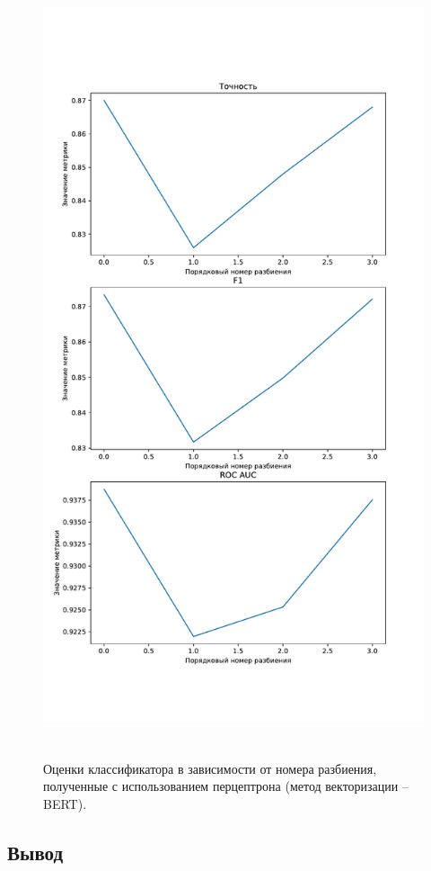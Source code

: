 \begin{figure}[H]
	\centering
	\includegraphics[height=23cm]{inc/plots/perceptronMetricsBert.pdf}
	\caption{ Оценки классификатора в зависимости от номера разбиения, полученные с использованием перцептрона (метод векторизации -- BERT). }
	\label{img:perceptronMetricsBert}
\end{figure}

\subsection*{Вывод}

